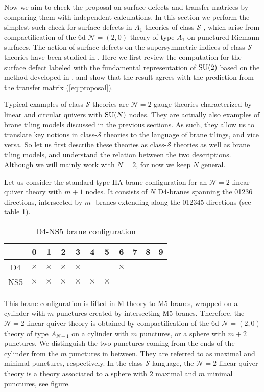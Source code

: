 Now we aim to check the proposal on surface defects and transfer matrices
by comparing them with independent calculations. In this section we
perform the simplest such check for surface defects in $A_{1}$ theories
of class $\mathcal{S}$ \cite{Gaiotto:2009we,Gaiotto:2009hg}, which arise from compactification
of the 6d $\mathcal{N}=\left(2,0\right)$ theory of type $A_{1}$
on punctured Riemann surfaces. The action of surface defects on the
supersymmetric indices of class-$\mathcal{S}$ theories have been
studied in \cite{Gaiotto:2012xa, Gadde:2013dda, Alday:2013kda,Bullimore:2014nla}. Here we first review the computation for the surface
defect labeled with the fundamental representation of $\mathrm{SU}(2)$ based
on the method developed in \cite{Gaiotto:2012xa}, and show that the result agrees
with the prediction from the transfer matrix (\ref{eq:proposal}). 

Typical examples of class-$\mathcal{S}$ theories are $\mathcal{N}=2$
gauge theories characterized by linear and circular quivers with $\mathrm{SU}(N)$
nodes. They are actually also examples of brane tiling models discussed
in the previous sections. As such, they allow us to translate key
notions in class-$\mathcal{S}$ theories to the language of brane
tilings, and vice versa. So let us first describe these theories as
class-$\mathcal{S}$ theories as well as brane tiling models, and
understand the relation between the two descriptions. Although we
will mainly work with $N=2$, for now we keep $N$ general. 

Let us consider the standard type IIA brane configuration for an $\mathcal{N}=2$
linear quiver theory with $m+1$ nodes. It consists of $N$ D4-branes
spanning the 01236 directions, intersected by $m$ -branes extending
along the 012345 directions (see table \ref{tab:D4NS5}). 
\begin{table}
\caption{D4-NS5 brane configuration}
\label{tab:D4NS5}
\vspace{0.2cm}
  \centering
    \begin{tabular}{|c|c|c|c|c|c|c|c|c|c|c|}
\hline 
  & 0 & 1 & 2 & 3 & 4 & 5 & 6 & 7 & 8 & 9\tabularnewline
\hline 
D4       & $\times$ & $\times$ & $\times$ & $\times$ &    &    &    $\times$ & \phantom{X} & \phantom{X} &  \tabularnewline
\hline 
NS5    & $\times$ & $\times$ & $\times$ & $\times$ & $\times$ & $\times$ &    &    &    &  \phantom{X}  \tabularnewline
\hline 
    \end{tabular}
\end{table}
This brane configuration is lifted in M-theory to M5-branes, wrapped
on a cylinder with $m$ punctures created by intersecting M5-branes.
Therefore, the $\mathcal{N}=2$ linear quiver theory is obtained by
compactification of the 6d $\mathcal{N}=\left( 2,0 \right)$ theory
of type $A_{N-1}$ on a cylinder with $m$ punctures, or a sphere
with $m+2$ punctures. We distinguish the two punctures coming from
the ends of the cylinder from the $m$ punctures in between. They
are referred to as maximal and minimal punctures, respectively. In
the class-$\mathcal{S}$ language, the $\mathcal{N}=2$ linear quiver
theory is a theory associated to a sphere with $2$ maximal and $m$
minimal punctures, see figure. 


